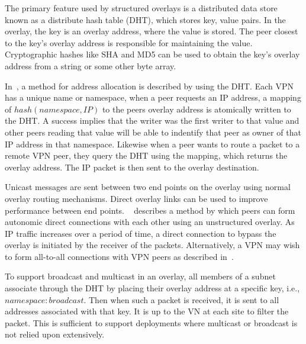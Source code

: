 The primary feature used by structured overlays is a distributed data store
known as a distribute hash table (DHT), which stores key, value pairs.  In
the overlay, the key is an overlay address, where the value is stored.  The
peer closest to the key's overlay address is responsible for maintaining the
value.  Cryptographic hashes like SHA and MD5 can be used to obtain the key's
overlay address from a string or some other byte array.

In~\cite{pcgrid07, i3}, a method for address allocation is described by using
the DHT.  Each VPN has a unique name or namespace, when a peer requests an
IP address, a mapping of $hash(namespace, IP)$ to the peers overlay address
is atomically written to the DHT.  A success implies that the writer was the
first writer to that value and other peers reading that value will be able to
indentify that peer as owner of that IP address in that namespace.  Likewise
when a peer wants to route a packet to a remote VPN peer, they query the DHT
using the mapping, which returns the overlay address.  The IP packet is then
sent to the overlay destination.

Unicast messages are sent between two end points on the overlay using normal
overlay routing mechanisms.  Direct overlay links can be used to improve
performance between end points.  ~\cite{ipop} describes a method by which peers
can form autonomic direct connections with each other using an unstructured
overlay.  As IP traffic increases over a period of time, a direct connection to
bypass the overlay is initiated by the receiver of the packets.  Alternatively,
a VPN may wish to form all-to-all connections with VPN peers as described
in~\cite{cops08}.

To support broadcast and multicast in an overlay, all members of a subnet
associate through the DHT by placing their overlay address at a specific key,
i.e., $namespace:broadcast$.  Then when such a packet is received, it is sent
to all addresses associated with that key.  It is up to the VN at each site to
filter the packet.  This is sufficient to support deployments where multicast
or broadcast is not relied upon extensively.  

